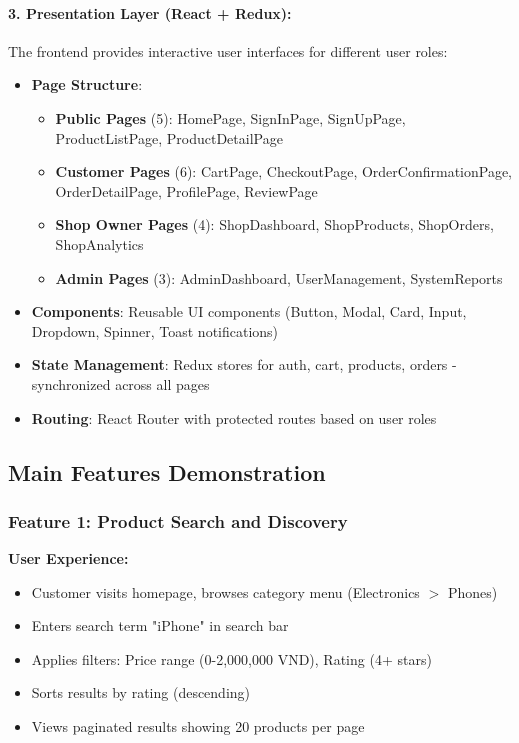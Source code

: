 \paragraph{3. Presentation Layer (React + Redux):}

The frontend provides interactive user interfaces for different user roles:

\begin{itemize}
    \item \textbf{Page Structure}:
    \begin{itemize}
        \item \textbf{Public Pages} (5): HomePage, SignInPage, SignUpPage, ProductListPage, ProductDetailPage
        \item \textbf{Customer Pages} (6): CartPage, CheckoutPage, OrderConfirmationPage, OrderDetailPage, ProfilePage, ReviewPage
        \item \textbf{Shop Owner Pages} (4): ShopDashboard, ShopProducts, ShopOrders, ShopAnalytics
        \item \textbf{Admin Pages} (3): AdminDashboard, UserManagement, SystemReports
    \end{itemize}
    \item \textbf{Components}: Reusable UI components (Button, Modal, Card, Input, Dropdown, Spinner, Toast notifications)
    \item \textbf{State Management}: Redux stores for auth, cart, products, orders - synchronized across all pages
    \item \textbf{Routing}: React Router with protected routes based on user roles
\end{itemize}

\subsection{Main Features Demonstration}

\subsubsection{Feature 1: Product Search and Discovery}

\textbf{User Experience:}
\begin{itemize}
    \item Customer visits homepage, browses category menu (Electronics $>$ Phones)
    \item Enters search term "iPhone" in search bar
    \item Applies filters: Price range (0-2,000,000 VND), Rating (4+ stars)
    \item Sorts results by rating (descending)
    \item Views paginated results showing 20 products per page
\end{itemize}

